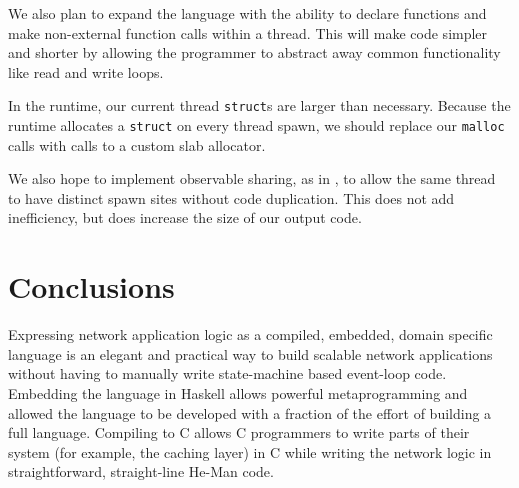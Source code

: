 \documentclass[preprint]{sigplanconf}
\renewcommand{\t}{\texttt}
\begin{document}
We also plan to expand the language with the ability to declare functions and
make non-external function calls within a thread. This will make code simpler
and shorter by allowing the programmer to abstract away common functionality
like read and write loops.

In the runtime, our current thread \t{struct}s are larger than necessary.
Because the runtime allocates a \t{struct} on every thread spawn, we should
replace our \t{malloc} calls with calls to a custom slab allocator.

We also hope to implement observable sharing, as in \cite{Gill}, to allow the
same thread to have distinct spawn sites without code duplication. This does not
add inefficiency, but does increase the size of our output code. 

\section{Conclusions}
Expressing network application logic as a compiled, embedded, domain
specific language is an elegant and practical way to build scalable
network applications without having to manually write state-machine
based event-loop code. Embedding the language in Haskell allows
powerful metaprogramming and allowed the language to be developed with
a fraction of the effort of building a full language. Compiling to C
allows C programmers to write parts of their system (for example, the
caching layer) in C while writing the network logic in
straightforward, straight-line He-Man code.


\pagebreak
{}

\end{document}
